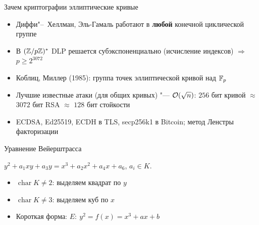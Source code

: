 \documentclass{ca-slides}
\author{}
\begin{document}
\titleframe

\begin{canvasframe}{Зачем криптографии эллиптические кривые}
  \begin{itemize}
    \item Диффи"--~Хеллман, Эль-Гамаль работают в \textbf{любой} конечной циклической группе
    \item В $(\mathbb{Z}/p\mathbb{Z})^{*}$ DLP решается субэкспоненциально (исчисление индексов) $\Rightarrow$
      $p \ge 2^{3072}$
    \item Коблиц, Миллер (1985): группа точек эллиптической кривой над $\mathbb{F}_{p}$
    \item Лучшие известные атаки (для общих кривых) "--- $\mathcal{O}(\sqrt n)$:
      $256$ бит кривой $\approx$ $3072$ бит RSA $\approx$ $128$ бит стойкости
    \item ECDSA, Ed25519, ECDH в TLS, secp256k1 в Bitcoin; метод Ленстры факторизации
  \end{itemize}
\end{canvasframe}

\begin{canvasframe}{Уравнение Вейерштрасса}
  \begin{definition}
    $y^2 + a_1 xy + a_3 y = x^3 + a_2 x^2 + a_4 x + a_6$, \quad $a_i \in K$.
  \end{definition}
  \begin{itemize}
    \item $\operatorname{char} K \ne 2$: выделяем квадрат по $y$
    \item $\operatorname{char} K \ne 3$: выделяем куб по $x$
    \item Короткая форма: \quad $E\colon\ y^2 = f(x) = x^3 + ax + b$
  \end{itemize}
\end{canvasframe}
\end{document}
